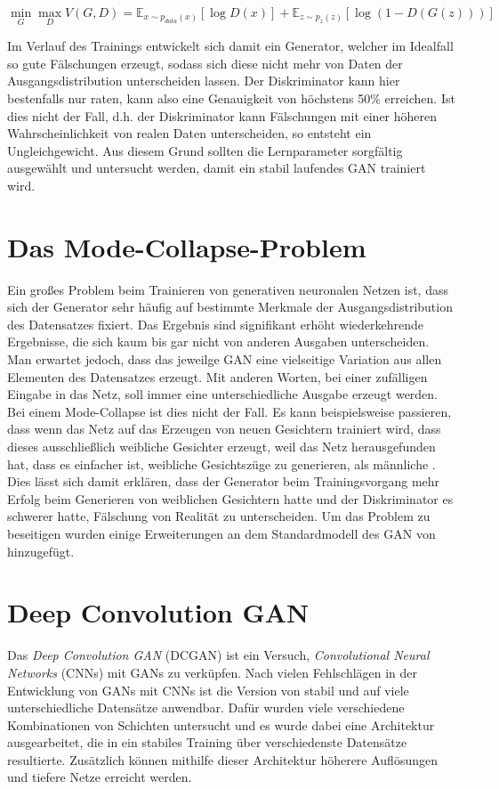 \documentclass{hsflensburg}
\begin{document}
  \[
    \min_G \max_D V(G, D) = \mathbb{E}_{x \sim p_{data}(x)}\left[ \log D(x) \right] + \mathbb{E}_{z \sim p_z(z)}\left[ \log (1 - D(G(z))) \right]
  \]

  Im Verlauf des Trainings entwickelt sich damit ein Generator, welcher im
  Idealfall so gute Fälschungen erzeugt, sodass sich diese nicht mehr von Daten
  der Ausgangsdistribution unterscheiden lassen. Der Diskriminator kann hier
  bestenfalls nur raten, kann also eine Genauigkeit von höchstens 50\%
  erreichen. Ist dies nicht der Fall, d.h. der Diskriminator kann Fälschungen
  mit einer höheren Wahrscheinlichkeit von realen Daten unterscheiden, so
  entsteht ein Ungleichgewicht. Aus diesem Grund sollten die Lernparameter
  sorgfältig ausgewählt und untersucht werden, damit ein stabil laufendes GAN
  trainiert wird.
  
  \section{Das Mode-Collapse-Problem}
  Ein großes Problem beim Trainieren von generativen neuronalen Netzen ist, dass
  sich der Generator sehr häufig auf bestimmte Merkmale der Ausgangsdistribution
  des Datensatzes fixiert. Das Ergebnis sind signifikant erhöht wiederkehrende
  Ergebnisse, die sich kaum bis gar nicht von anderen Ausgaben unterscheiden.
  Man erwartet jedoch, dass das jeweilge GAN eine vielseitige Variation aus
  allen Elementen des Datensatzes erzeugt. Mit anderen Worten, bei einer
  zufälligen Eingabe in das Netz, soll immer eine unterschiedliche Ausgabe
  erzeugt werden. Bei einem Mode-Collapse ist dies nicht der Fall. Es kann
  beispielsweise passieren, dass wenn das Netz auf das Erzeugen von neuen
  Gesichtern trainiert wird, dass dieses ausschließlich weibliche Gesichter
  erzeugt, weil das Netz herausgefunden hat, dass es einfacher ist, weibliche
  Gesichtszüge zu generieren, als männliche \cite{richardson2018gans}. Dies
  lässt sich damit erklären, dass der Generator beim Trainingsvorgang mehr
  Erfolg beim Generieren von weiblichen Gesichtern hatte und der Diskriminator
  es schwerer hatte, Fälschung von Realität zu unterscheiden. Um das Problem zu
  beseitigen wurden einige Erweiterungen an dem Standardmodell des GAN von
  \cite{goodfellow2014generative} hinzugefügt.

  \section{Deep Convolution GAN}
  Das \textit{Deep Convolution GAN} (DCGAN) ist ein Versuch,
  \textit{Convolutional Neural Networks} (CNNs) mit GANs zu verküpfen. Nach
  vielen Fehlschlägen in der Entwicklung von GANs mit CNNs ist die Version von
  \cite{radford2016unsupervised} stabil und auf viele unterschiedliche
  Datensätze anwendbar. Dafür wurden viele verschiedene Kombinationen von
  Schichten untersucht und es wurde dabei eine Architektur ausgearbeitet, die
  in ein stabiles Training über verschiedenste Datensätze resultierte.
  Zusätzlich können mithilfe dieser Architektur höherere Auflösungen und tiefere
  Netze erreicht werden.
\end{document}
